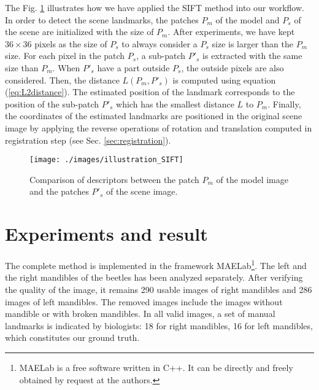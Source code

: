 \documentclass[twoside,twocolumn,10pt]{article}
\begin{document}
The Fig. \ref{fig:Illustrate} illustrates how we have applied the SIFT method into our workflow.
In order to detect the scene landmarks, the patches \textit{$P_m$} of the model and \textit{$P_s$} of the scene are initialized with the size of $P_m$.
After experiments, we have kept $36 \times 36$ pixels as the size of \textit{$P_s$} to always consider a \textit{$P_s$} size is larger than the \textit{$P_m$} size. For each pixel in the patch \textit{$P_s$}, a sub-patch \textit{$P'_s$} is extracted with the same size than \textit{$P_m$}.
When \textit{$P'_s$} have a part outside \textit{$P_s$}, the outside pixels are also considered.
Then, the distance \textit{$L(P_m,P'_s)$} is computed using equation (\ref{eq:L2distance}).
The estimated position of the landmark corresponds to the position of the sub-patch \textit{$P'_s$} which has the smallest distance $L$ to \textit{$P_m$}.
Finally, the coordinates of the estimated landmarks are positioned in the original scene image by applying the reverse operations of rotation and translation computed in registration step (see Sec. \ref{sec:registration}).

\begin{figure}[htbp]
    \centering
    \texttt{[image: ./images/illustration\_SIFT]}
    \caption{Comparison of descriptors between the patch $P_m$ of the model image and the patches $P'_s$ of the scene image.}
    \label{fig:Illustrate}
\end{figure}

\section{Experiments and result}
\label{sec:experiments}

The complete method is implemented in the framework MAELab\footnote{MAELab
  is a free software written in C++. It can be directly and freely obtained by request
  at the authors.}. The left and the right mandibles of the beetles has been analyzed separately.
After verifying the quality of the image, it remains 290 usable images of right mandibles and 286 images of left mandibles.
The removed images include the images without mandible or with broken mandibles.
In all valid images, a set of manual landmarks is indicated by
biologists: 18 for right mandibles, 16 for left mandibles, which
constitutes our ground truth.
\end{document}
